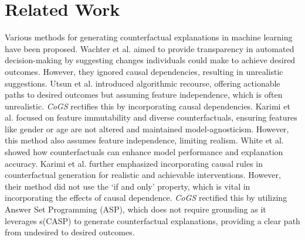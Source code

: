 \section{Related Work}
\vspace{-0.09 in}
Various methods for generating counterfactual explanations in machine learning have been proposed. Wachter et al. \cite{wachter} aimed to provide transparency in automated decision-making by suggesting changes individuals could make to achieve desired outcomes. However, they ignored causal dependencies, resulting in unrealistic suggestions. Utsun et al. \cite{ref_2_ustun} introduced algorithmic recourse, offering actionable paths to desired outcomes but assuming feature independence, which is often unrealistic. \textit{CoGS} rectifies this by incorporating causal dependencies. Karimi et al. \cite{alt_karimi} focused on feature immutability and diverse counterfactuals, ensuring features like gender or age are not altered and maintained model-agnosticism. 
 However, this method also assumes feature independence, limiting realism.
White et al. \cite{ref_clear} showed how counterfactuals can enhance model performance and explanation accuracy. Karimi et al. \cite{ref_4_karimi_2} further emphasized incorporating causal rules in counterfactual generation for realistic and achievable interventions. 
However, their method did not use the `if and only' property, which is vital in incorporating the effects of causal dependence. \textit{CoGS} rectified this by utilizing Answer Set Programming (ASP), which does not require grounding as it leverages s(CASP) to generate counterfactual explanations, providing a clear path from undesired to desired outcomes.

